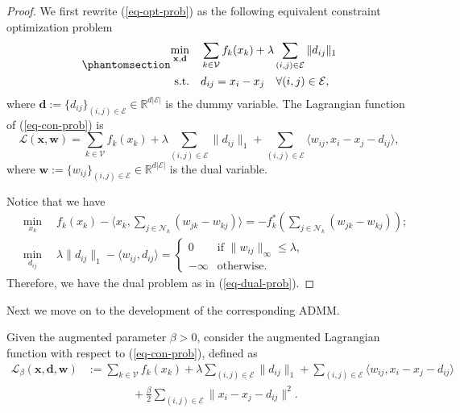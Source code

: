 \documentclass[
  letterpaper,
  DIV=11,
  numbers=noendperiod]{scrartcl}
\theoremstyle{plain}
\theoremstyle{remark}
\begin{document}
\begin{proof}
We first rewrite (\ref{eq-opt-prob}) as the following equivalent
constraint optimization problem
\begin{equation}\phantomsection\label{eq-con-prob}{
\begin{aligned}
  \min_{\mathbf{x}, \mathbf{d}} & \quad \sum_{k \in \mathcal{V}} f_k(x_k) + \lambda \sum_{(i, j) \in \mathcal{E}} \| d_{ij} \|_1 \\
  \text{s.t.} & \quad d_{ij} = x_i - x_j \quad \forall (i, j) \in \mathcal{E},
\end{aligned}
}\end{equation} where
\(\mathbf{d} := \{d_{ij}\}_{(i, j) \in \mathcal{E}} \in \mathbb{R}^{d| \mathcal{E} |}\)
is the dummy variable. The Lagrangian function of (\ref{eq-con-prob}) is
\[
\mathcal{L}(\mathbf{x}, \mathbf{w}) = \sum_{k \in \mathcal{V}} f_k(x_k) + \lambda \sum_{(i, j) \in \mathcal{E}} \| d_{ij} \|_1 + \sum_{(i, j) \in \mathcal{E}} \langle w_{ij}, x_i - x_j - d_{ij} \rangle,
\] where
\(\mathbf{w} := \{w_{ij}\}_{(i, j) \in \mathcal{E}} \in \mathbb{R}^{d| \mathcal{E} |}\)
is the dual variable.

Notice that we have \[
\begin{aligned}
  & \min_{x_k} \quad f_k(x_k) - \langle x_k, \sum_{j \in \mathcal{N}_k}(w_{jk} - w_{kj}) \rangle = -f_k^{*}(\sum_{j \in \mathcal{N}_k}(w_{jk} - w_{kj})); \\[0.2cm]
  & \min_{d_{ij}} \quad \lambda \| d_{ij} \|_1 - \langle w_{ij}, d_{ij} \rangle =
    \begin{cases}
      0 & \text{if } \| w_{ij} \|_{\infty} \leq \lambda, \\
      -\infty & \text{otherwise}.
    \end{cases}
\end{aligned}
\] Therefore, we have the dual problem as in (\ref{eq-dual-prob}).
\end{proof}

Next we move on to the development of the corresponding ADMM.

Given the augmented parameter \(\beta > 0\), consider the augmented
Lagrangian function with respect to (\ref{eq-con-prob}), defined as \[
\begin{aligned}
  \mathcal{L}_{\beta}(\mathbf{x}, \mathbf{d}, \mathbf{w}) & := \sum_{k \in \mathcal{V}} f_k(x_k) + \lambda \sum_{(i, j) \in \mathcal{E}} \| d_{ij} \|_1 + \sum_{(i, j) \in \mathcal{E}} \langle w_{ij}, x_i - x_j - d_{ij} \rangle \\
  & \qquad \qquad + \frac{\beta}{2} \sum_{(i, j) \in \mathcal{E}} \| x_i - x_j - d_{ij} \|^2.
\end{aligned}
\]
\end{document}
